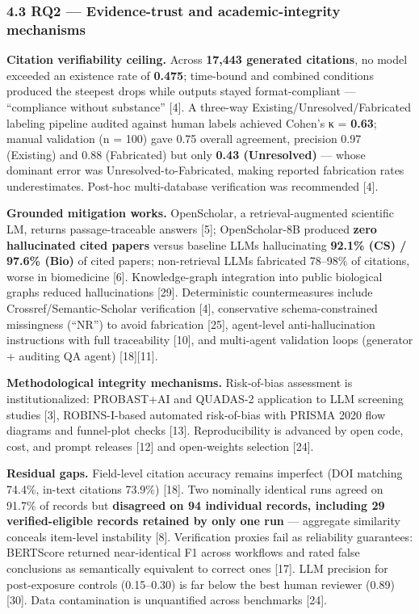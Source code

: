 \documentclass[11pt]{article}
\begin{document}
\subsubsection{4.3 RQ2 --- Evidence-trust and academic-integrity
mechanisms}\label{rq2-evidence-trust-and-academic-integrity-mechanisms}

\textbf{Citation verifiability ceiling.} Across \textbf{17,443 generated
citations}, no model exceeded an existence rate of \textbf{0.475};
time-bound and combined conditions produced the steepest drops while
outputs stayed format-compliant --- ``compliance without substance''
{[}4{]}. A three-way Existing/Unresolved/Fabricated labeling pipeline
audited against human labels achieved Cohen's κ = \textbf{0.63}; manual
validation (n = 100) gave 0.75 overall agreement, precision 0.97
(Existing) and 0.88 (Fabricated) but only \textbf{0.43 (Unresolved)} ---
whose dominant error was Unresolved-to-Fabricated, making reported
fabrication rates underestimates. Post-hoc multi-database verification
was recommended {[}4{]}.

\textbf{Grounded mitigation works.} OpenScholar, a retrieval-augmented
scientific LM, returns passage-traceable answers {[}5{]}; OpenScholar-8B
produced \textbf{zero hallucinated cited papers} versus baseline LLMs
hallucinating \textbf{92.1\% (CS) / 97.6\% (Bio)} of cited papers;
non-retrieval LLMs fabricated 78--98\% of citations, worse in
biomedicine {[}6{]}. Knowledge-graph integration into public biological
graphs reduced hallucinations {[}29{]}. Deterministic countermeasures
include Crossref/Semantic-Scholar verification {[}4{]}, conservative
schema-constrained missingness (``NR'') to avoid fabrication {[}25{]},
agent-level anti-hallucination instructions with full traceability
{[}10{]}, and multi-agent validation loops (generator + auditing QA
agent) {[}18{]}{[}11{]}.

\textbf{Methodological integrity mechanisms.} Risk-of-bias assessment is
institutionalized: PROBAST+AI and QUADAS-2 application to LLM screening
studies {[}3{]}, ROBINS-I-based automated risk-of-bias with PRISMA 2020
flow diagrams and funnel-plot checks {[}13{]}. Reproducibility is
advanced by open code, cost, and prompt releases {[}12{]} and
open-weights selection {[}24{]}.

\textbf{Residual gaps.} Field-level citation accuracy remains imperfect
(DOI matching 74.4\%, in-text citations 73.9\%) {[}18{]}. Two nominally
identical runs agreed on 91.7\% of records but \textbf{disagreed on 94
individual records, including 29 verified-eligible records retained by
only one run} --- aggregate similarity conceals item-level instability
{[}8{]}. Verification proxies fail as reliability guarantees: BERTScore
returned near-identical F1 across workflows and rated false conclusions
as semantically equivalent to correct ones {[}17{]}. LLM precision for
post-exposure controls (0.15--0.30) is far below the best human reviewer
(0.89) {[}30{]}. Data contamination is unquantified across benchmarks
{[}24{]}.
\end{document}
